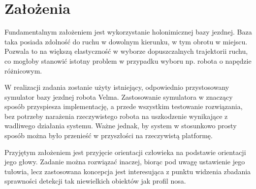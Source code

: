 \section{Założenia}

Fundamentalnym założeniem jest wykorzystanie holonimicznej bazy jezdnej. Baza taka posiada zdolność do ruchu w dowolnym kierunku, w tym obrotu w miejscu. Pozwala to na większą elastyczność w wyborze dopuszczalnych trajektorii ruchu, co mogłoby stanowić istotny problem w przypadku wyboru np. robota o napędzie różnicowym.

W realizacji zadania zostanie użyty istniejący, odpowiednio przystosowany symulator bazy jezdnej robota Velma. Zastosowanie symulatora w znaczący sposób przyspiesza implementację, a przede wszystkim testowanie rozwiązania, bez potrzeby narażenia rzeczywistego robota na uszkodzenie wynikające z wadliwego działania systemu. Ważne jednak, by system w stosunkowo prosty sposób można było przenieść w przyszłości na rzeczywistą platformę.

Przyjętym założeniem jest przyjęcie orientacji człowieka na podstawie orientacji jego głowy. Zadanie można rozwiązać inaczej, biorąc pod uwagę ustawienie jego tułowia, lecz zastosowana koncepcja jest interesująca z punktu widzenia zbadania sprawności detekcji tak niewielkich obiektów jak profil nosa.



